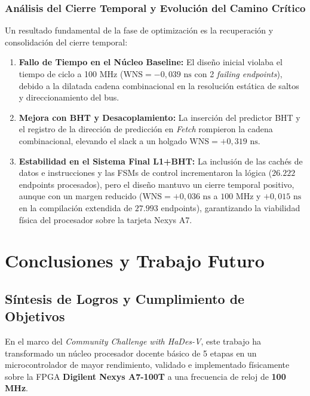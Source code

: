 \documentclass[10pt,a4paper]{article}
\begin{document}
\subsubsection{Análisis del Cierre Temporal y Evolución del Camino Crítico}
Un resultado fundamental de la fase de optimización es la recuperación y consolidación del cierre temporal:
\begin{enumerate}
    \item \textbf{Fallo de Tiempo en el Núcleo Baseline:} El diseño inicial violaba el tiempo de ciclo a 100 MHz ($\text{WNS} = -0,039\text{ ns}$ con 2 
    \textit{failing endpoints}), debido a la dilatada cadena combinacional en la resolución estática de saltos y direccionamiento del bus.
    \item \textbf{Mejora con BHT y Desacoplamiento:} La inserción del predictor BHT y el registro de la dirección de predicción en \textit{Fetch} rompieron la cadena 
    combinacional, elevando el slack a un holgado $\text{WNS} = +0,319\text{ ns}$.
    \item \textbf{Estabilidad en el Sistema Final L1+BHT:} La inclusión de las cachés de datos e instrucciones y las FSMs de control incrementaron la lógica 
    ($26.222$ endpoints procesados), pero el diseño mantuvo un cierre temporal positivo, aunque con un margen reducido ($\text{WNS} = +0,036\text{ ns}$ a 
    $100\text{ MHz}$ y $+0,015\text{ ns}$ en la compilación extendida de $27.993$ endpoints), garantizando la viabilidad física del procesador sobre la tarjeta Nexys A7.
\end{enumerate}


\section{Conclusiones y Trabajo Futuro}

\subsection{Síntesis de Logros y Cumplimiento de Objetivos}
En el marco del \textit{Community Challenge with HaDes-V}, este trabajo ha transformado un núcleo
procesador docente básico de 5 etapas en un microcontrolador de mayor rendimiento, validado e implementado físicamente sobre la FPGA 
\textbf{Digilent Nexys A7-100T} a una frecuencia de reloj de \textbf{100 MHz}.
\end{document}
